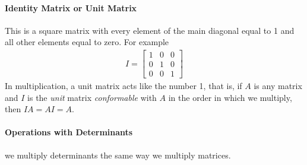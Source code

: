             \paragraph{Identity Matrix or Unit Matrix} %
            \label{par:Identity Matrix or Unit Matrix}
            This is a square matrix with every element of the main diagonal
            equal to 1 and all other elements equal to zero. For example
            \begin{align}
                \label{identity matrix}
                I = \begin{bmatrix}
                    1 & 0 & 0 \\
                    0 & 1 & 0\\
                    0 & 0 & 1
                \end{bmatrix}
            \end{align}
            In multiplication, a unit matrix acts like the number 1, 
            that is, if $A$ is any matrix and $I$ is the \textit{unit} matrix \textit{conformable} with $A$ in the order 
            in which we multiply, then $IA = AI = A$.

            \paragraph{Operations with Determinants} %
            \label{par:Operations with Determinants}
            we multiply determinants the same way we multiply matrices.


